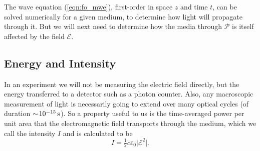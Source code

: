     The wave equation (\ref{eqn:fo_mwe}), first-order in space $z$ and time
    $t$, can be solved numerically for a given medium, to determine how light
    will propagate through it. But we will next need to determine how the media
    through $\mathcal{P}$ is itself  affected by the field $\mathcal{E}$.

  \subsection{Energy and Intensity}

    In an experiment we will not be measuring the electric field directly, but
    the energy transferred to a detector such as a photon counter. Also, any
    macroscopic measurement of light is necessarily going to extend over many
    optical cycles (of duration $\sim\!\unit[10^{-15}]{s}$). So a property
    useful to us is the time-averaged power per unit area that the
    electromagnetic field transports through the medium, which we call the
    intensity $I$ and is calculated to be\cite{griffiths1999introduction}
    \begin{equation}\label{eqn:intensity}
      I = \tfrac{1}{2}c\varepsilon_0 \lvert \mathcal{E}^2 \rvert.
    \end{equation}
